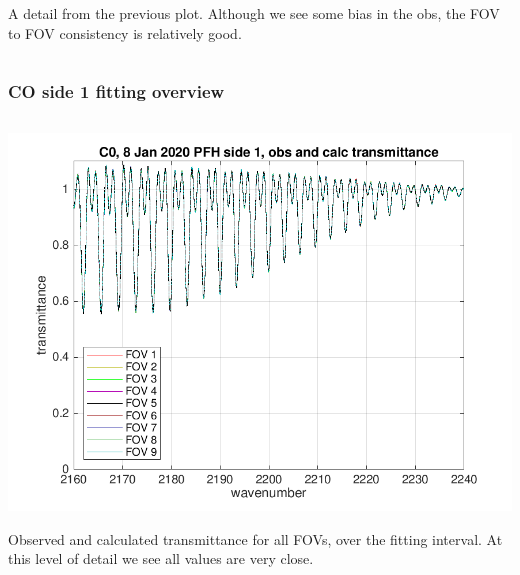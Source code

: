 \documentclass[10pt]{beamer}
\begin{document}
\begin{frame}
\begin{columns}[t]
\begin{column}{0.5\textwidth}
A detail from the previous plot.  Although we see some bias in the
obs, the FOV to FOV consistency is relatively good.

\end{column}
\end{columns}
\end{frame}
\begin{frame}
\frametitle{CO side 1 fitting overview}
\begin{columns}[t]
\begin{column}{0.5\textwidth}  
  \begin{centering}
  \includegraphics[width=\textwidth]{01-08_pfl_s1_CO/CO_obs_and_calc.png}
  \end{centering}\vspace{3mm}

Observed and calculated transmittance for all FOVs, over the fitting
interval.  At this level of detail we see all values are very close.

\end{column}


\end{columns}
\end{frame}
\end{document}
